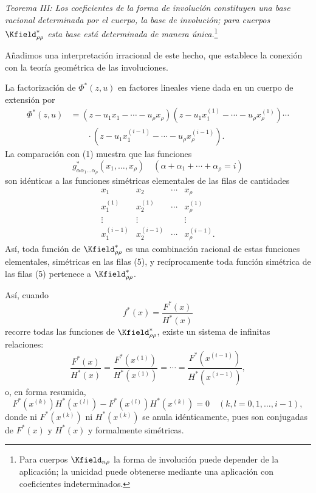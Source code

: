 \documentclass[11pt]{article}
\begin{document}
\emph{Teorema III: Los coeficientes de la forma de involución constituyen una base racional determinada por el cuerpo, la base de involución; para cuerpos $\Kfield^*_{\rho\rho}$ esta base está determinada de manera única.}\footnote{Para cuerpos $\Kfield_{n\rho}$ la forma de involución puede depender de la aplicación; la unicidad puede obtenerse mediante una aplicación con coeficientes indeterminados.}

Añadimos una interpretación irracional de este hecho, que establece la conexión con la teoría geométrica de las involuciones.

La factorización de $\Phi^*(z,u)$ en factores lineales viene dada en un cuerpo de extensión por
\begin{equation}
\begin{aligned}
 \Phi^*(z,u)&=(z-u_1x_1-\cdots-u_\rho x_\rho)
 (z-u_1x_1^{(1)}-\cdots-u_\rho x_\rho^{(1)})\cdots\\
 &\qquad\cdot
 (z-u_1x_1^{(i-1)}-\cdots-u_\rho x_\rho^{(i-1)}).
\end{aligned}
\tag{4}
\end{equation}
La comparación con (1) muestra que las funciones
\[
  g^*_{\alpha\alpha_1\ldots\alpha_\rho}(x_1,
  \ldots,x_\rho)\quad(\alpha+\alpha_1+\cdots+\alpha_\rho=i)
\]
son idénticas a las funciones simétricas elementales de las filas de cantidades
\begin{equation}
\begin{array}{cccc}
  x_1 & x_2 & \cdots & x_\rho\\
  x_1^{(1)} & x_2^{(1)} & \cdots & x_\rho^{(1)}\\
  \vdots & \vdots & & \vdots\\
  x_1^{(i-1)} & x_2^{(i-1)} & \cdots & x_\rho^{(i-1)}.
\end{array}
\tag{5}
\end{equation}
Así, toda función de $\Kfield^*_{\rho\rho}$ es una combinación racional de estas funciones elementales, simétricas en las filas (5), y recíprocamente toda función simétrica de las filas (5) pertenece a $\Kfield^*_{\rho\rho}$.

Así, cuando
\[
  f^*(x)=\frac{F^*(x)}{H^*(x)}
\]
recorre todas las funciones de $\Kfield^*_{\rho\rho}$, existe un sistema de infinitas relaciones:
\begin{equation}
  \frac{F^*(x)}{H^*(x)}=
  \frac{F^*(x^{(1)})}{H^*(x^{(1)})}=\cdots=
  \frac{F^*(x^{(i-1)})}{H^*(x^{(i-1)})},
\tag{6}
\end{equation}
o, en forma resumida,
\[
  F^*(x^{(k)})H^*(x^{(l)})-
  F^*(x^{(l)})H^*(x^{(k)})=0
  \quad(k,l=0,1,\ldots,i-1),
\]
donde ni $F^*(x^{(k)})$ ni $H^*(x^{(k)})$ se anula idénticamente, pues son conjugadas de $F^*(x)$ y $H^*(x)$ y formalmente simétricas.
\end{document}
